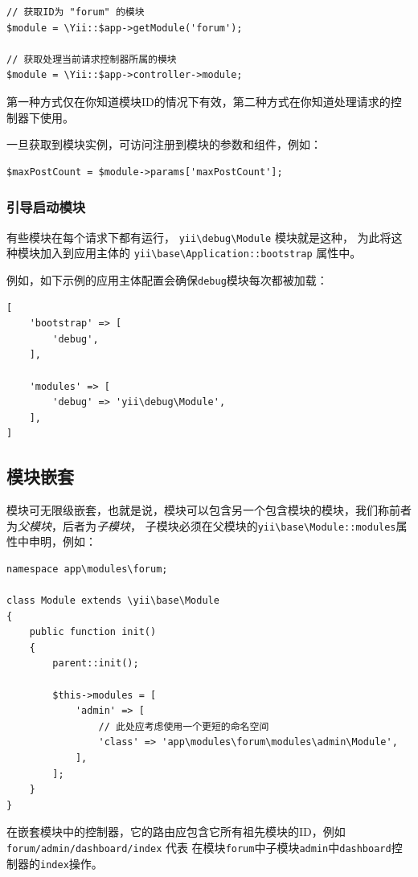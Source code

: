 \lstset{language=php}\begin{lstlisting}
// 获取ID为 "forum" 的模块
$module = \Yii::$app->getModule('forum');

// 获取处理当前请求控制器所属的模块
$module = \Yii::$app->controller->module;
\end{lstlisting}
第一种方式仅在你知道模块ID的情况下有效，第二种方式在你知道处理请求的控制器下使用。

一旦获取到模块实例，可访问注册到模块的参数和组件，例如：

\lstset{language=php}\begin{lstlisting}
$maxPostCount = $module->params['maxPostCount'];
\end{lstlisting}
\subsubsection{引导启动模块 \label{structure-modules.md::bootstrapping-modules}}
有些模块在每个请求下都有运行， \texttt{yii{\allowbreak{}\textbackslash}debug{\allowbreak{}\textbackslash}Module} 模块就是这种，
为此将这种模块加入到应用主体的 \texttt{yii{\allowbreak{}\textbackslash}base{\allowbreak{}\textbackslash}Application\allowbreak{}::\allowbreak{}bootstrap} 属性中。

例如，如下示例的应用主体配置会确保\lstinline|debug|模块每次都被加载：

\lstset{language=php}\begin{lstlisting}
[
    'bootstrap' => [
        'debug',
    ],

    'modules' => [
        'debug' => 'yii\debug\Module',
    ],
]
\end{lstlisting}
\subsection{模块嵌套 \label{structure-modules.md::nested-modules}}
模块可无限级嵌套，也就是说，模块可以包含另一个包含模块的模块，我们称前者为\textit{父模块}，后者为\textit{子模块}，
子模块必须在父模块的\texttt{yii{\allowbreak{}\textbackslash}base{\allowbreak{}\textbackslash}Module\allowbreak{}::\allowbreak{}modules}属性中申明，例如：

\lstset{language=php}\begin{lstlisting}
namespace app\modules\forum;

class Module extends \yii\base\Module
{
    public function init()
    {
        parent::init();

        $this->modules = [
            'admin' => [
                // 此处应考虑使用一个更短的命名空间
                'class' => 'app\modules\forum\modules\admin\Module',
            ],
        ];
    }
}
\end{lstlisting}
在嵌套模块中的控制器，它的路由应包含它所有祖先模块的ID，例如\lstinline|forum/admin/dashboard/index| 代表
在模块\lstinline|forum|中子模块\lstinline|admin|中\lstinline|dashboard|控制器的\lstinline|index|操作。


